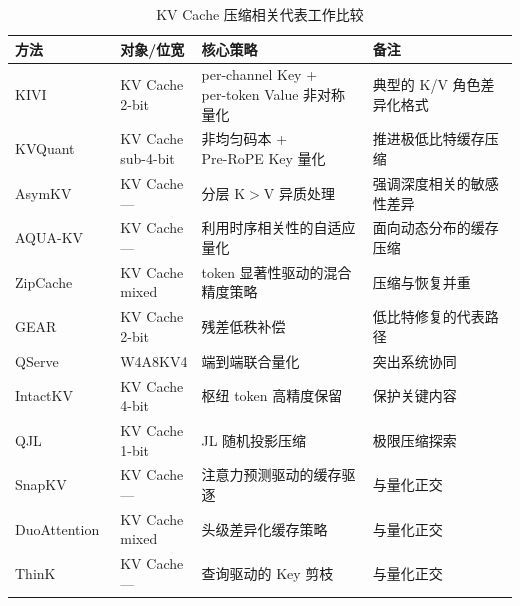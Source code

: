\begin{table}[H]
  \centering
  \caption{KV Cache 压缩相关代表工作比较}
  \label{tab:ch2-kv-comparison}
  \label{tab:kv_quant_compare}
  \label{tab:t0-related-work}
  {\footnotesize
  \setlength{\tabcolsep}{3.8pt}
  \renewcommand{\arraystretch}{1.12}
  \begin{tabularx}{\linewidth}{@{}>{\raggedright\arraybackslash}p{2.20cm}>{\raggedright\arraybackslash}p{1.45cm}>{\raggedright\arraybackslash}X>{\raggedright\arraybackslash}p{3.80cm}@{}}
    \toprule
    方法 & 对象/位宽 & 核心策略 & 备注 \\
    \midrule
    KIVI~\cite{liu2024kivi} & \makecell[l]{KV Cache\\2-bit} & \makecell[l]{per-channel Key +\\per-token Value 非对称量化} & 典型的 K/V 角色差异化格式 \\
    KVQuant~\cite{hooper2024kvquant} & \makecell[l]{KV Cache\\sub-4-bit} & \makecell[l]{非均匀码本 +\\Pre-RoPE Key 量化} & 推进极低比特缓存压缩 \\
    AsymKV~\cite{tao2024asymkv} & \makecell[l]{KV Cache\\---} & 分层 K$>$V 异质处理 & 强调深度相关的敏感性差异 \\
    AQUA-KV~\cite{shutova2025aquakv} & \makecell[l]{KV Cache\\---} & 利用时序相关性的自适应量化 & 面向动态分布的缓存压缩 \\
    ZipCache~\cite{he2024zipcache} & \makecell[l]{KV Cache\\mixed} & token 显著性驱动的混合精度策略 & 压缩与恢复并重 \\
    GEAR~\cite{kang2024gear} & \makecell[l]{KV Cache\\2-bit} & 残差低秩补偿 & 低比特修复的代表路径 \\
    QServe~\cite{lin2024qserve} & W4A8KV4 & 端到端联合量化 & 突出系统协同 \\
    IntactKV~\cite{liu2024intactkv} & \makecell[l]{KV Cache\\4-bit} & 枢纽 token 高精度保留 & 保护关键内容 \\
    QJL~\cite{zandieh2024qjl} & \makecell[l]{KV Cache\\1-bit} & JL 随机投影压缩 & 极限压缩探索 \\
    SnapKV~\cite{li2024snapkv} & \makecell[l]{KV Cache\\---} & 注意力预测驱动的缓存驱逐 & 与量化正交 \\
    DuoAttention~\cite{xiao2024duoattention} & \makecell[l]{KV Cache\\mixed} & 头级差异化缓存策略 & 与量化正交 \\
    ThinK~\cite{xu2024think} & \makecell[l]{KV Cache\\---} & 查询驱动的 Key 剪枝 & 与量化正交 \\
    \bottomrule
  \end{tabularx}}
\end{table}

